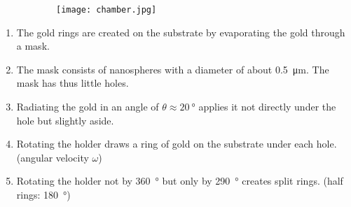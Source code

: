 \begin{figure}[htbp]
\begin{subfigure}[t][][t]{0.72\textwidth}
\end{subfigure}
\hfill
\begin{subfigure}[t][][t]{0.26\textwidth}
\texttt{[image: chamber.jpg]}
\end{subfigure}
\end{figure}
\begin{enumerate}
    \item The gold rings are created on the substrate by evaporating the gold through a mask.
    \item The mask consists of nanospheres with a diameter of about \SI{0.5}{\micro\metre}.
    The mask has thus little holes.
    \item Radiating the gold in an angle of $\theta\approx\SI{20}{\degree}$ applies it not directly under the hole but slightly aside.
    \item Rotating the holder draws a ring of gold on the substrate under each hole. (angular velocity $\omega$)
    \item Rotating the holder not by \SI{360}{\degree} but only by \SI{290}{\degree} creates split rings. (half rings: \SI{180}{\degree})
\end{enumerate}
